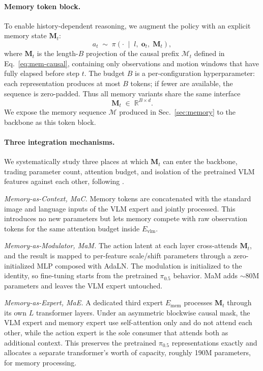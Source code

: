\documentclass{article}
\begin{document}
\paragraph{Memory token block.}
To enable history-dependent reasoning, we augment the policy with an explicit
memory state $\mathbf{M}_t$:
\begin{equation}
  a_t \;\sim\; \pi\!\left(\cdot \;\middle|\; l,\; \mathbf{o}_t,\; \mathbf{M}_t\right),
  \label{eq:mem-policy}
\end{equation}
where $\mathbf{M}_t$ is the length-$B$ projection of the causal prefix
$\mathcal{M}_t$ defined in Eq.~\ref{eq:mem-causal}, containing only observations and
motion windows that have fully elapsed before step $t$.
The budget $B$ is a per-configuration hyperparameter: each representation
produces at most $B$ tokens; if fewer are available, the sequence is zero-padded.
Thus all memory variants share the same interface
\begin{equation}
  \mathbf{M}_t \;\in\; \mathbb{R}^{B\times d}.
  \label{eq:mem-interface}
\end{equation}
We expose the memory sequence $\mathcal{M}$ produced in
Sec.~\ref{sec:memory} to the backbone as this token block.


\paragraph{Three integration mechanisms.}
We systematically study three places at which $\mathbf{M}_t$ can enter the
backbone, trading parameter count, attention budget, and isolation of the
pretrained VLM features against each other, following \citet{dai2026robomme}.

\emph{Memory-as-Context, MaC.} Memory tokens are concatenated with the
standard image and language inputs of the VLM expert and jointly processed.
This introduces no new parameters but lets memory compete with raw
observation tokens for the same attention budget inside $E_{\mathrm{vlm}}$.

\emph{Memory-as-Modulator, MaM.} The action latent at each layer
cross-attends $\mathbf{M}_t$, and the result is mapped to per-feature
scale/shift parameters through a zero-initialized MLP composed with
AdaLN. The modulation is initialized to the identity, so fine-tuning starts
from the pretrained $\pi_{0.5}$ behavior. MaM adds $\sim\!80$M parameters
and leaves the VLM expert untouched.

\emph{Memory-as-Expert, MaE.} A dedicated third expert
$E_{\mathrm{mem}}$ processes $\mathbf{M}_t$ through its own $L$ transformer
layers. Under an asymmetric blockwise causal mask, the VLM expert and
memory expert use self-attention only and do not attend each other, while
the action expert is the sole consumer that attends both as additional
context. This preserves the pretrained $\pi_{0.5}$ representations exactly
and allocates a separate transformer's worth of capacity, roughly 190M parameters, for memory processing.
\end{document}
